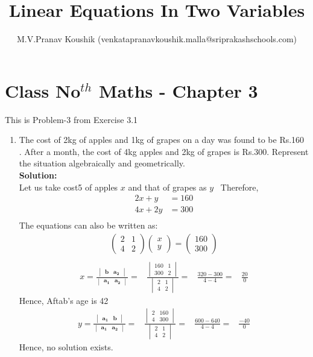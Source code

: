 \documentclass[12pt]{article}
\title{Linear Equations In Two Variables}
\author{M.V.Pranav Koushik (venkatapranavkoushik.malla@sriprakashschools.com)}
\newcommand{\myvec}[1]{\ensuremath{\begin{pmatrix}#1\end{pmatrix}}}
\newcommand{\mydet}[1]{\ensuremath{\begin{vmatrix}#1\end{vmatrix}}}
\newcommand{\solution}{\noindent \textbf{Solution: }}
\let\vec\mathbf
\begin{document}
\maketitle
\section*{Class No$^{th}$ Maths - Chapter 3}
This is Problem-3 from Exercise 3.1
\begin{enumerate}
\item The cost of 2kg of apples and 1kg of grapes on a day was found to be  Rs.160 . After a month, the cost of 4kg apples and 2kg of grapes is Rs.300. Represent the situation algebraically and geometrically. \\
\solution \\ Let us take cost5 of apples $x$ and that of grapes as $y$
\
Therefore,
\begin{align}
    2x+y&=160\\
    4x+2y&=300\\
\end{align}
The equations can also be written as:\\
\begin{align}
\myvec{2&1\\4&2}\myvec{x\\y}=\myvec{160\\300}\\
\end{align}
\begin{align}
x =\frac{\mydet{ \vec{b} & \vec{a_2}}}{\mydet{ \vec{a_1} & \vec{a_2}}} = &
\frac{\mydet{160&1\\300&2}}{ \mydet{2&1\\4&2}} =&
\frac{320-300}{4-4}=&
\frac{20}{0}
\end{align}
Hence, Aftab's age is 42
\begin{align}
y = \frac{\mydet{ \vec{a_1} & \vec{b}}}{\mydet{ \vec{a_1} & \vec{a_2}}}=&
\frac{\mydet{2&160\\4&300}}{ \mydet{2&1\\4&2}}=&
\frac{600-640}{4-4}=&
\frac{-40}{0}
\end{align}
 Hence, no solution exists.

\end{enumerate}
\end{document}

